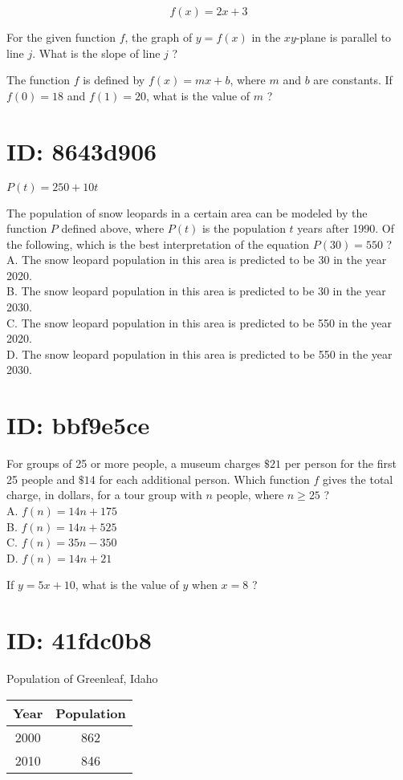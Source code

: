$$
f(x)=2 x+3
$$

For the given function $f$, the graph of $y=f(x)$ in the $x y$-plane is parallel to line $j$. What is the slope of line $j$ ?

The function $f$ is defined by $f(x)=m x+b$, where $m$ and $b$ are constants. If $f(0)=18$ and $f(1)=20$, what is the value of $m$ ?

\section*{ID: 8643d906}
$P(t)=250+10 t$

The population of snow leopards in a certain area can be modeled by the function $P$ defined above, where $P(t)$ is the population $t$ years after 1990. Of the following, which is the best interpretation of the equation $P(30)=550$ ?\\
A. The snow leopard population in this area is predicted to be 30 in the year 2020.\\
B. The snow leopard population in this area is predicted to be 30 in the year 2030.\\
C. The snow leopard population in this area is predicted to be 550 in the year 2020.\\
D. The snow leopard population in this area is predicted to be 550 in the year 2030.

\section*{ID: bbf9e5ce}
For groups of 25 or more people, a museum charges $\$ 21$ per person for the first 25 people and $\$ 14$ for each additional person. Which function $f$ gives the total charge, in dollars, for a tour group with $n$ people, where $n \geq 25$ ?\\
A. $f(n)=14 n+175$\\
B. $f(n)=14 n+525$\\
C. $f(n)=35 n-350$\\
D. $f(n)=14 n+21$

If $y=5 x+10$, what is the value of $y$ when $x=8$ ?

\section*{ID: 41fdc0b8}
Population of Greenleaf, Idaho

\begin{center}
\begin{tabular}{|c|c|}
\hline
Year & Population \\
\hline
2000 & 862 \\
\hline
2010 & 846 \\
\hline
\end{tabular}
\end{center}

